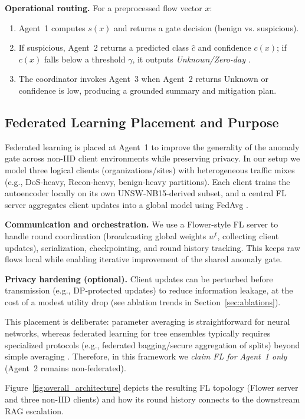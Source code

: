 \documentclass[conference]{IEEEtran}
\begin{document}
\textbf{Operational routing.} For a preprocessed flow vector $x$:
\begin{enumerate}
  \item Agent~1 computes $s(x)$ and returns a gate decision (benign vs. suspicious).
  \item If suspicious, Agent~2 returns a predicted class $\hat{c}$ and confidence $c(x)$; if $c(x)$ falls below a threshold $\gamma$, it outputs \emph{Unknown/Zero-day} \cite{Scheirer2013OpenSet}.
  \item The coordinator invokes Agent~3 when Agent~2 returns Unknown or confidence is low, producing a grounded summary and mitigation plan.
\end{enumerate}

\subsection{Federated Learning Placement and Purpose}
Federated learning is placed at Agent~1 to improve the generality of the anomaly gate across non-IID client environments while preserving privacy. In our setup we model three logical clients (organizations/sites) with heterogeneous traffic mixes (e.g., DoS-heavy, Recon-heavy, benign-heavy partitions). Each client trains the autoencoder locally on its own UNSW-NB15-derived subset, and a central FL server aggregates client updates into a global model using FedAvg \cite{mcmahan2017fedavg}.

\textbf{Communication and orchestration.} We use a Flower-style FL server to handle round coordination (broadcasting global weights $w^t$, collecting client updates), serialization, checkpointing, and round history tracking. This keeps raw flows local while enabling iterative improvement of the shared anomaly gate.

\textbf{Privacy hardening (optional).} Client updates can be perturbed before transmission (e.g., DP-protected updates) to reduce information leakage, at the cost of a modest utility drop (see ablation trends in Section~\ref{sec:ablations}).

This placement is deliberate: parameter averaging is straightforward for neural networks, whereas federated learning for tree ensembles typically requires specialized protocols (e.g., federated bagging/secure aggregation of splits) beyond simple averaging \cite{kairouz2021flsurvey}. Therefore, in this framework we \emph{claim FL for Agent~1 only} (Agent~2 remains non-federated).

Figure~\ref{fig:overall_architecture} depicts the resulting FL topology (Flower server and three non-IID clients) and how its round history connects to the downstream RAG escalation.
\end{document}
